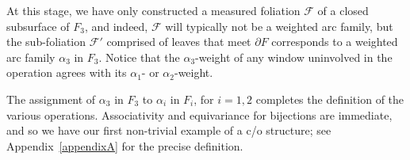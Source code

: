 At this stage, we have only constructed a measured foliation ${\mathcal F}$ of a closed subsurface of $F_3$, and
indeed,
${\mathcal F}$ will typically not be a weighted arc family, but the sub-foliation
${\mathcal
F}'$ comprised of leaves that meet $\partial F$ corresponds to a weighted arc family $\alpha _3$ in $F_3$.
Notice that
the $\alpha _3$-weight of any window uninvolved in the operation agrees with its $\alpha _1$- or $\alpha _2$-weight.

The assignment of $\alpha_3$ in $F_3$ to $\alpha _i$ in $F_i$, for
$i=1,2$ completes the def\/inition of the various operations.
Associativity and equivariance for bijections are immediate, and so
we have our f\/irst non-trivial example of a c/o structure; see
Appendix~\ref{appendixA} for the precise def\/inition.

